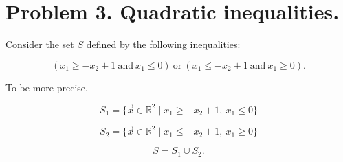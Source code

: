 \documentclass[
  12pt,
]{fphw}
\begin{document}
\newpage
\section*{Problem 3. Quadratic inequalities.}

Consider the set $S$ defined by the following inequalities:

\[
(x_1 \ge -x_2 + 1 \ \text{and} \ x_1 \le 0)
\ \text{or} \
(x_1 \le -x_2 + 1 \ \text{and} \ x_1 \ge 0).
\]

To be more precise,

\[
S_1 = \{ \vec{x} \in \mathbb{R}^2 \mid x_1 \ge -x_2 + 1, \ x_1 \le 0 \}
\]

\[
S_2 = \{ \vec{x} \in \mathbb{R}^2 \mid x_1 \le -x_2 + 1, \ x_1 \ge 0 \}
\]

\[
S = S_1 \cup S_2.
\]
\end{document}
